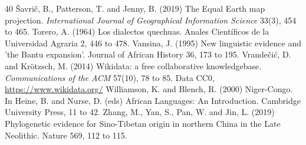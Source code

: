 \documentclass[11pt,a4paper]{article}
\begin{document}
\begin{thebibliography}{40}
 Šavrič, B., Patterson, T. and Jenny, B. (2019) The Equal Earth map projection. \emph{International Journal of Geographical Information Science} 33(3), 454 to 465.
 Torero, A. (1964) Los dialectos quechuas. Anales Científicos de la Universidad Agraria 2, 446 to 478.
 Vansina, J. (1995) New linguistic evidence and 'the Bantu expansion'. Journal of African History 36, 173 to 195.
 Vrandečić, D. and Krötzsch, M. (2014) Wikidata: a free collaborative knowledgebase. \emph{Communications of the ACM} 57(10), 78 to 85. Data CC0, \url{https://www.wikidata.org/}
 Williamson, K. and Blench, R. (2000) Niger-Congo. In Heine, B. and Nurse, D. (eds) African Languages: An Introduction. Cambridge University Press, 11 to 42.
 Zhang, M., Yan, S., Pan, W. and Jin, L. (2019) Phylogenetic evidence for Sino-Tibetan origin in northern China in the Late Neolithic. Nature 569, 112 to 115.
\end{thebibliography}
\end{document}

